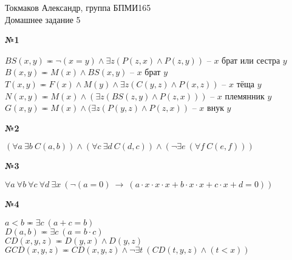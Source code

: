 \documentclass{article}
\newenvironment{task}{\begin{center}\fontsize{14}{14}\selectfont\bf}{\rm\fontsize{12}{12}\selectfont\end{center}}
\begin{document}
	\begin{center}
		Токмаков Александр, группа БПМИ165 \\
		Домашнее задание 5
	\end{center}

	
	\begin{task} 
		№1
	\end{task}
	\begin{center}
	$BS(x, y) \eqcirc \neg(x=y) \wedge \exists z (P(z, x) \wedge P(z, y))$ -- $x$ брат или сестра $y$ \\
	$B(x, y) \eqcirc M(x) \wedge BS(x, y)$ -- $x$ брат $y$ \\
	$T(x, y) \eqcirc F(x) \wedge M(y) \wedge \exists z (C(y, z) \wedge P(x, z))$ -- $x$ тёща $y$ \\
	$N(x, y) \eqcirc M(x) \wedge (\exists z (BS(z, y) \wedge P(z, x)))$ -- $x$ племянник $y$ \\
	$G(x, y) \eqcirc M(x) \wedge (\exists z (P(y, z) \wedge P(z, x))$ -- $x$ внук $y$ \\
	\end{center}
	

		
	\begin{task} 
		№2
	\end{task}
	\begin{center}
		$(\forall a\ \exists b \ C(a, b))\wedge(\forall c\ \exists d\ C(d, c)) \wedge (\neg\exists e\ (\forall f\ C(e, f)))$
	\end{center}
	
	
	\begin{task} 
		№3
	\end{task}
	\begin{center}
		$\forall a\ \forall b\ \forall c\ \forall d\ \exists x\ (\neg (a = 0)\ \rightarrow\ (a\cdot x\cdot x\cdot x + b\cdot x\cdot x + c\cdot x + d = 0))$
	\end{center}
	
		
		
	\begin{task} 
		№4
	\end{task}
	\begin{center}
		$a < b \eqcirc \exists c\ (a + c = b)$ \\
		$D(a, b) \eqcirc \exists c\ (a = b\cdot c)$ \\
		$CD(x, y, z) \eqcirc D(y, x) \wedge D(y, z)$ \\
		$GCD(x, y, z) \eqcirc CD(x, y, z) \wedge \neg \exists t\ (CD(t, y, z) \wedge (t < x))$
	\end{center}
	
\end{document}
